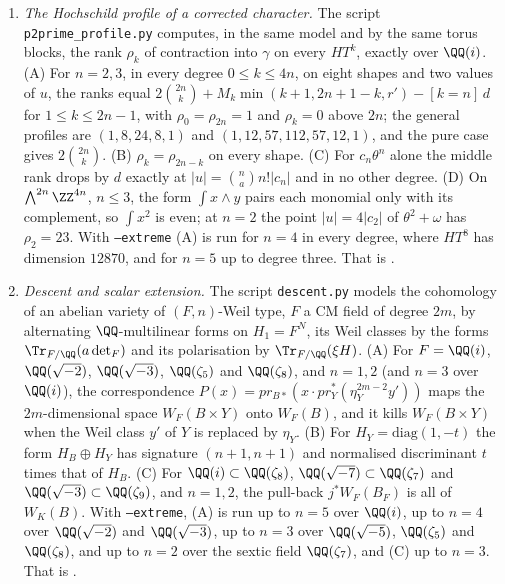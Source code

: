 \begin{enumerate}[label=\textup{(\Roman*)},leftmargin=*]
\item \emph{The Hochschild profile of a corrected character.} The script
  \texttt{p2prime\_\allowbreak profile.py} computes, in the same model and by
  the same torus blocks, the rank $\rho_{k}$ of contraction into $\gamma$ on
  every $HT^{k}$, exactly over $\QQ(i)$. (A) For $n=2,3$, in every degree
  $0\le k\le4n$, on eight shapes and two values of $u$, the ranks equal
  $2\binom{2n}{k}+M_{k}\min(k+1,2n+1-k,r')-[k=n]\,d$ for $1\le k\le2n-1$, with
  $\rho_{0}=\rho_{2n}=1$ and $\rho_{k}=0$ above $2n$; the general profiles are
  $(1,8,24,8,1)$ and $(1,12,57,112,57,12,1)$, and the pure case gives
  $2\binom{2n}{k}$. (B) $\rho_{k}=\rho_{2n-k}$ on every shape. (C) For
  $c_{n}\theta^{n}$ alone the middle rank drops by $d$ exactly at
  $|u|=\binom{n}{a}n!|c_{n}|$ and in no other degree. (D) On
  $\bigwedge^{2n}\ZZ^{4n}$, $n\le3$, the form $\int x\wedge y$ pairs each
  monomial only with its complement, so $\int x^{2}$ is even; at $n=2$ the
  point $|u|=4|c_{2}|$ of $\theta^{2}+\omega$ has $\rho_{2}=23$. With
  \texttt{--extreme} (A) is run for $n=4$ in every degree, where $HT^{8}$ has
  dimension $12870$, and for $n=5$ up to degree three. That is
  .

\item \emph{Descent and scalar extension.} The script \texttt{descent.py}
  models the cohomology of an abelian variety of $(F,n)$-Weil type, $F$ a CM
  field of degree $2m$, by alternating $\QQ$-multilinear forms on
  $H_{1}=F^{N}$, its Weil classes by the forms $\Tr_{F/\QQ}(a\det_{F})$ and its
  polarisation by $\Tr_{F/\QQ}(\xi H)$. (A) For $F=\QQ(i)$, $\QQ(\sqrt{-2})$,
  $\QQ(\sqrt{-3})$, $\QQ(\zeta_{5})$ and $\QQ(\zeta_{8})$, and $n=1,2$ (and
  $n=3$ over $\QQ(i)$), the correspondence
  $P(x)=pr_{B*}(x\cdot pr_{Y}^{*}(\eta_{Y}^{2m-2}y'))$ maps the $2m$-dimensional
  space $W_{F}(B\times Y)$ onto $W_{F}(B)$, and it kills $W_{F}(B\times Y)$
  when the Weil class $y'$ of $Y$ is replaced by $\eta_{Y}$. (B) For
  $H_{Y}=\mathrm{diag}(1,-t)$ the form $H_{B}\oplus H_{Y}$ has signature
  $(n+1,n+1)$ and normalised discriminant $t$ times that of $H_{B}$. (C) For
  $\QQ(i)\subset\QQ(\zeta_{8})$, $\QQ(\sqrt{-7})\subset\QQ(\zeta_{7})$ and
  $\QQ(\sqrt{-3})\subset\QQ(\zeta_{9})$, and $n=1,2$, the pull-back
  $j^{*}W_{F}(B_{F})$ is all of $W_{K}(B)$. With \texttt{--extreme}, (A) is
  run up to $n=5$ over $\QQ(i)$, up to $n=4$ over $\QQ(\sqrt{-2})$ and
  $\QQ(\sqrt{-3})$, up to $n=3$ over $\QQ(\sqrt{-5})$, $\QQ(\zeta_{5})$ and
  $\QQ(\zeta_{8})$, and up to $n=2$ over the sextic field $\QQ(\zeta_{7})$, and
  (C) up to $n=3$. That is .


\end{enumerate}
